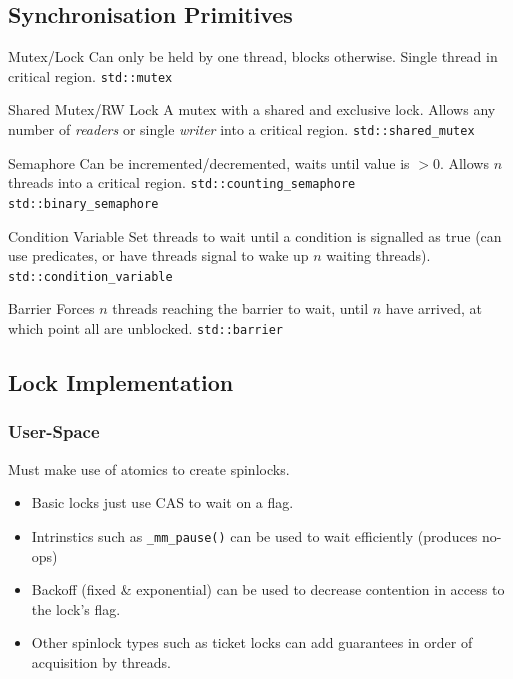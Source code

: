 \subsection{Synchronisation Primitives}
\begin{tcbraster}[raster columns=2,raster equal height]
    \begin{definitionbox}{Mutex/Lock}
        Can only be held by one thread, blocks otherwise. Single thread in critical region.
        \tcblower
        \texttt{std::mutex}
    \end{definitionbox}
    \begin{definitionbox}{Shared Mutex/RW Lock}
        A mutex with a shared and exclusive lock.
        Allows any number of \textit{readers} or single \textit{writer} into a critical region.
        \tcblower
        \texttt{std::shared_mutex}
    \end{definitionbox}
    \begin{definitionbox}{Semaphore}
        Can be incremented/decremented, waits until value is $> 0$. 
        Allows $n$ threads into a critical region.
        \tcblower
        \texttt{std::counting_semaphore}
        \\ \texttt{std::binary_semaphore}
    \end{definitionbox}
    \begin{definitionbox}{Condition Variable}
        Set threads to wait until a condition is signalled as true (can use predicates, or have threads signal to wake up $n$ waiting threads).
        \tcblower
        \texttt{std::condition_variable} 
    \end{definitionbox}
\end{tcbraster}
\begin{definitionbox}{Barrier}
    Forces $n$ threads reaching the barrier to wait, until $n$ have arrived, at which point all are unblocked.
    \tcblower
    \texttt{std::barrier}
\end{definitionbox}

\subsection{Lock Implementation}
\subsubsection{User-Space}
Must make use of atomics to create spinlocks.
\begin{itemize}
    \item Basic locks just use CAS to wait on a flag.
    \item Intrinstics such as \texttt{_mm_pause()} can be used to wait efficiently (produces no-ops)
    \item Backoff (fixed \& exponential) can be used to decrease contention in access to the lock's flag.
    \item Other spinlock types such as ticket locks can add guarantees in order of acquisition by threads. 
\end{itemize}

